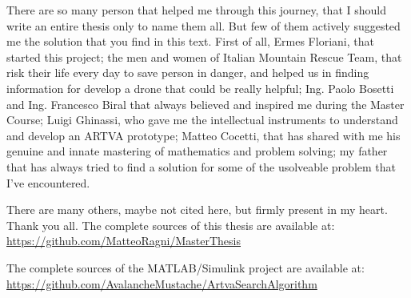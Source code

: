 \begin{aknowledgements}
\noindent
There are so many person that helped me through this journey, that I should write an entire thesis only to name them all. But few of them actively suggested me the solution that you find in this text. First of all, Ermes Floriani, that started this project; the men and women of Italian Mountain Rescue Team, that risk their life every day to save person in danger, and helped us in finding information for develop a drone that could be really helpful; Ing. Paolo Bosetti and Ing. Francesco Biral that always believed and inspired me during the Master Course; Luigi Ghinassi, who gave me the intellectual instruments to understand and develop an ARTVA prototype; Matteo Cocetti, that has shared with me his genuine and innate mastering of mathematics and problem solving; my father that has always tried to find a solution for some of the usolveable problem that I've encountered.

\noindent
There are many others, maybe not cited here, but firmly present in my heart. Thank you all.
\vspace{2cm}
\scriptsize{The complete sources of this thesis are available at: \url{https://github.com/MatteoRagni/MasterThesis}}

\scriptsize{The complete sources of the MATLAB/Simulink project are available at: \url{https://github.com/AvalancheMustache/ArtvaSearchAlgorithm}}
\end{aknowledgements}
